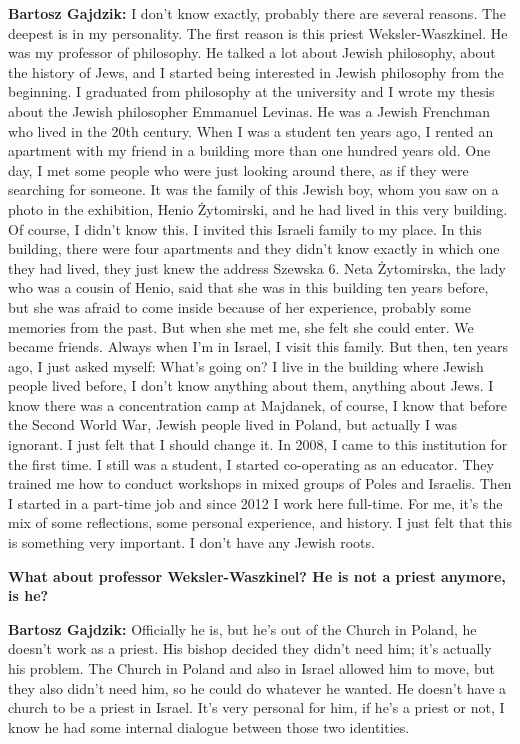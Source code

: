 \textbf{Bartosz Gajdzik:} I don’t know exactly, probably there are several reasons. The deepest is in my personality. The first reason is this priest Weksler-Waszkinel. He was my professor of philosophy. He talked a lot about Jewish philosophy, about the history of Jews, and I started being interested in Jewish philosophy from the beginning. I graduated from philosophy at the university and I wrote my thesis about the Jewish philosopher Emmanuel Levinas. He was a Jewish Frenchman who lived in the 20th century. When I was a student ten years ago, I rented an apartment with my friend in a building more than one hundred years old. One day, I met some people who were just looking around there, as if they were searching for someone. It was the family of this Jewish boy, whom you saw on a photo in the exhibition, Henio Żytomirski, and he had lived in this very building. Of course, I didn’t know this. I invited this Israeli family to my place. In this building, there were four apartments and they didn’t know exactly in which one they had lived, they just knew the address Szewska 6. Neta Żytomirska, the lady who was a cousin of Henio, said that she was in this building ten years before, but she was afraid to come inside because of her experience, probably some memories from the past. But when she met me, she felt she could enter. We became friends. Always when I’m in Israel, I visit this family. But then, ten years ago, I just asked myself: What’s going on? I live in the building where Jewish people lived before, I don’t know anything about them, anything about Jews. I know there was a concentration camp at Majdanek, of course, I know that before the Second World War, Jewish people lived in Poland, but actually I was ignorant. I just felt that I should change it. In 2008, I came to this institution for the first time. I still was a student, I started co-operating as an educator. They trained me how to conduct workshops in mixed groups of Poles and Israelis. Then I started in a part-time job and since 2012 I work here full-time. For me, it’s the mix of some reflections, some personal experience, and history. I just felt that this is something very important. I don’t have any Jewish roots. 

\textbf{What about professor Weksler-Waszkinel? He is not a priest anymore, is he?} 

\textbf{Bartosz Gajdzik:} Officially he is, but he’s out of the Church in Poland, he doesn’t work as a priest. His bishop decided they didn’t need him; it’s actually his problem. The Church in Poland and also in Israel allowed him to move, but they also didn’t need him, so he could do whatever he wanted. He doesn’t have a church to be a priest in Israel. It’s very personal for him, if he’s a priest or not, I know he had some internal dialogue between those two identities.  

